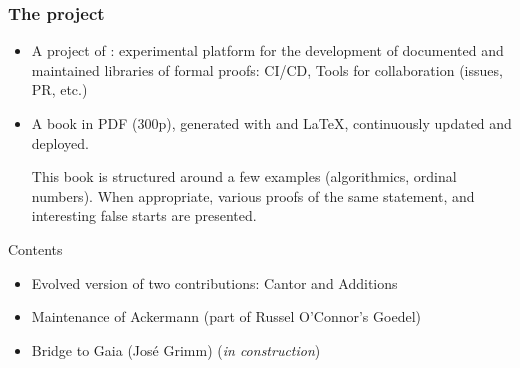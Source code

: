 \documentclass[10pt, fleqn]{beamer}
\begin{document}
\begin{frame}
  \frametitle{The \Hydras project}
  \begin{block}{}
    \begin{itemize}
    \item A project of \community:  experimental platform for the  development of
      \textcolor{lookcolor}{documented} and \textcolor{lookcolor}{maintained} libraries of formal proofs: 
    CI/CD,  Tools for collaboration (issues, PR, etc.)
   
  \item A book in PDF (300p), generated  with \textcolor{lookcolor}{\alectr} and \LaTeX, continuously updated and deployed.

    This book is structured around a few examples (algorithmics, ordinal numbers).
        When appropriate, various proofs of the same statement, and interesting false starts are presented.
    \end{itemize}
  \end{block}
  \begin{block}{Contents}
    \begin{itemize}
    \item Evolved version  of two contributions: \textcolor{plugincolor}{Cantor} and \textcolor{plugincolor}{Additions}
    \item Maintenance of \textcolor{plugincolor}{Ackermann}
      (part of Russel O'Connor's \textcolor{plugincolor}{Goedel})
    \item Bridge to \textcolor{plugincolor}{Gaia} (José Grimm) (\emph{in construction})
   
    \end{itemize}
  \end{block}
 
\end{frame}
   

  
      
\end{document}
